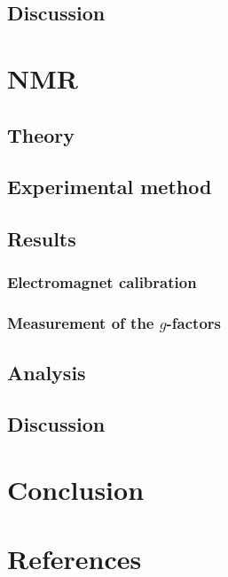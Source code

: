 \documentclass[a4paper]{jpconf}
\numberwithin{equation}{section}
\begin{document}
\subsection{Discussion}

\section{NMR} 
\subsection{Theory}
\subsection{Experimental method}
\subsection{Results}
\subsubsection{Electromagnet calibration}
\subsubsection{Measurement of the $g$-factors}
\subsection{Analysis}

\subsection{Discussion}

\section{Conclusion}

\section*{References}
\begin{thebibliography}{9}
\end{thebibliography}
\end{document}
